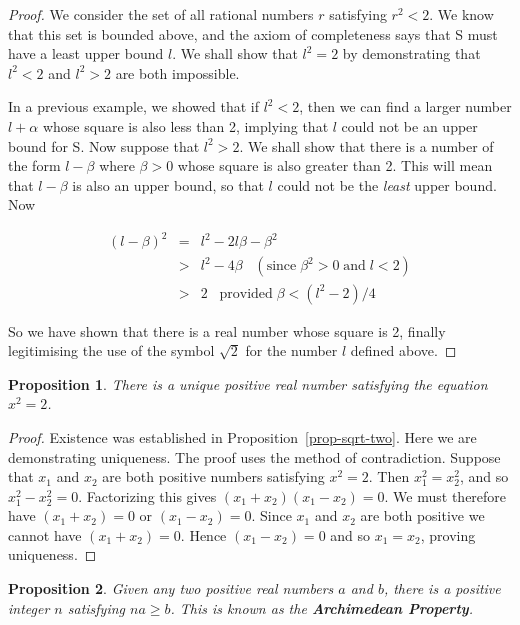\message{ !name(RealAnalysis.tex)}\documentclass[12pt]{scrbook}
\newtheorem{proposition}{Proposition}[section]
\begin{document}
\begin{proof}
We consider the set of all rational numbers $r$ satisfying $r^2 < 2$.  We know that this set is bounded above, and the axiom of completeness says that S must have a least upper bound $l$.  We shall show that $l^2 = 2$ by demonstrating that $l^2 < 2$ and $l^2 > 2$ are both impossible.

In a previous example, we showed that if $l^2 < 2$, then we can find a larger number $l + \alpha$ whose square is also less than 2, implying that $l$ could not be an upper bound for S.  Now suppose that $l^2 > 2$.  We shall show that there is a number of the form $l - \beta$ where $\beta > 0$ whose square is also greater than 2.  This will mean that  $l - \beta$ is also an upper bound, so that $l$ could not be the {\em least} upper bound. Now

	\begin{eqnarray*}
	(l  - \beta)^2 	&=& l^2 - 2 l \beta - \beta^2 \\
				&>& l^2 - 4 \beta \;\;\; (\text{since} \; \beta^2 > 0 \; \text{and} \; l < 2) \\
				&>&  2 \;\;\;  \text{provided} \; \beta < (l^2 - 2)/4
	\end{eqnarray*}
	
So we have shown that there is a real number whose square is 2, finally legitimising the use of the symbol $\sqrt{2}$ for the number $l$ defined above.
\end{proof}

\begin{proposition}
There is a unique positive real number satisfying the equation $x^2 = 2$.
\end{proposition}

\begin{proof}
Existence was established in Proposition~\ref{prop-sqrt-two}.  Here we are demonstrating uniqueness.  The proof uses the method of contradiction.  Suppose that $x_1$ and $x_2$ are both positive numbers satisfying $x^2 = 2$.  Then $x_1^2 = x_2^2$, and so $x_1^2 - x_2^2 = 0$.  Factorizing this gives $(x_1 + x_2)(x_1 - x_2) = 0$.  We must therefore have $(x_1 + x_2) = 0$ or $(x_1 - x_2) = 0$. Since $x_1$ and $x_2$ are both positive we cannot have $(x_1 + x_2) = 0$.  Hence $(x_1 - x_2) = 0$ and so $x_1 = x_2$, proving uniqueness.
\end{proof}

\begin{proposition}
Given any two positive real numbers $a$ and $b$, there is a positive integer $n$ satisfying $na \geq b$.  This is known as the {\bf Archimedean Property}.
\end{proposition}
\end{document}
